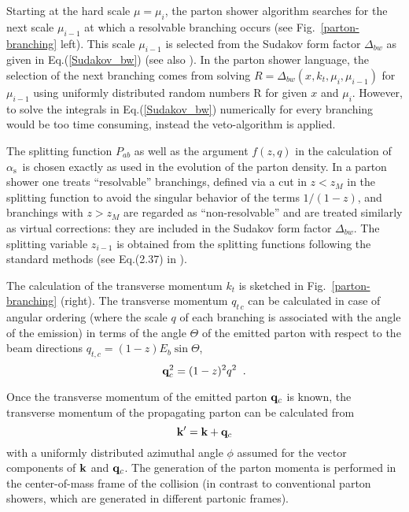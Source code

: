 \documentclass[11pt]{article} \usepackage{mystyle-new}
\newcommand{\as}{\ensuremath{\alpha_\mathrm{s}}}
\def\prp{t}
\def\kt{\ensuremath{k_{\prp}}}
\begin{document}
Starting at the hard scale $\mu=\mu_{i}$, the  parton shower algorithm searches for the next scale $\mu_{i-1}$ at which a resolvable branching occurs (see Fig.~\ref{parton-branching} left). This scale $\mu_{i-1}$ is selected from the Sudakov form factor $\Delta_{bw}$ as given in Eq.(\ref{Sudakov_bw})  (see also \cite{Jung:2010si}). 
In the parton shower language, the selection of the next branching comes from solving  $R=\Delta_{bw}(x,k_t,\mu_{i},\mu_{i-1})$ for $\mu_{i-1}$  using uniformly distributed random numbers R for given $x$ and $\mu_{i}$.
However, to solve the integrals in Eq.(\ref{Sudakov_bw}) numerically for every branching would be too time consuming, instead the veto-algorithm \cite{Bengtsson:1986gz,Platzer:2011dq} is applied. 

The splitting function $P_{ab}$ as well as the argument $f(z,q)$ in the calculation of \as\ is chosen exactly as used in the evolution of the parton density. In a parton shower one treats ``resolvable'' branchings, defined via a cut in $z < z_M$ in the splitting function  to avoid the singular behavior of the terms $1/(1-z)$, and branchings with $z> z_M$ are regarded as ``non-resolvable'' and are treated similarly as virtual corrections: they are included in the Sudakov form factor $\Delta_{bw} $. 
The  splitting variable $z_{i-1}$ is obtained from the splitting functions following the standard methods (see Eq.(2.37) in \cite{Hautmann:2017fcj}). 

The calculation of the  transverse momentum $\kt$ is sketched in Fig.~\ref{parton-branching} (right).
The transverse momentum $q_{t\,c}$ 
can be calculated in case of angular ordering (where the scale $q$ of each branching is associated with the angle of the emission)  in terms of the angle $\Theta$ of the emitted parton with respect to the beam directions $q_{t,c} = (1-z) E_{b} \sin \Theta$, 
\begin{equation}
  \label{ang-ordering}
 {\bf q}_{c}^2  =  (1-z)^2 q^{ 2}  \;\; .
\end{equation}

Once the transverse momentum of the emitted parton ${\bf q}_c$ is known, the transverse momentum of the propagating parton can be calculated from
\begin{equation}
{\bf k}^\prime = {\bf k} + {\bf q}_{c}
\label{kt-definition}
\end{equation}
with a uniformly distributed azimuthal angle $\phi$ assumed for the vector components of ${\bf k}$ and ${\bf q}_c$. The generation of the parton momenta is performed in the center-of-mass frame of the collision (in contrast to conventional parton showers, which are generated in different partonic frames).
\end{document}
